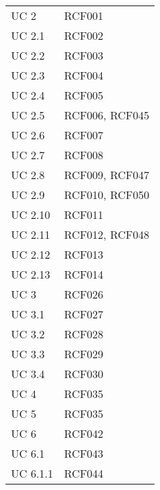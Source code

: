 \begin{longtabu} {X[c] X[c]}
   
   {UC 2} & RCF001 \\ 
   
   {UC 2.1} & RCF002 \\ 
   
   {UC 2.2} & RCF003 \\ 
   
   {UC 2.3} & RCF004 \\ 
   
   {UC 2.4} & RCF005 \\ 
   
   {UC 2.5} & RCF006, RCF045 \\
   
   {UC 2.6} & RCF007 \\ 
   
   {UC 2.7} & RCF008 \\ 
   
   {UC 2.8} & RCF009, RCF047 \\ 
   
   {UC 2.9} & RCF010, RCF050 \\
   
   {UC 2.10} & RCF011 \\ 
   
   {UC 2.11} & RCF012, RCF048 \\
   
   {UC 2.12} & RCF013 \\ 
   
   {UC 2.13} & RCF014 \\ 
   
   {UC 3} & RCF026 \\
   
   {UC 3.1} & RCF027 \\ 
   
   {UC 3.2} & RCF028 \\ 
   
   {UC 3.3} & RCF029 \\ 
   
   {UC 3.4} & RCF030 \\
   
   {UC 4} & RCF035 \\ 
   
   {UC 5} & RCF035 \\ 
   
   {UC 6} & RCF042 \\ 
   
   {UC 6.1} & RCF043 \\ 
   
   {UC 6.1.1} & RCF044 \\ 
   

\end{longtabu}
